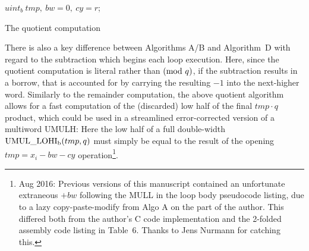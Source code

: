 \documentclass{article}
\begin{document}
\begin{algorithm}[H]
\SetAlgoLined
{}
\vspace{0.1in}
{
	$uint_b\ tmp,\ bw = 0,\ cy = r$;\\
}
\caption{The quotient computation}
\label{algo_d}
\end{algorithm}



There is also a key difference between Algorithms A/B and Algorithm~D with regard to the subtraction which begins each loop execution. Here, since the quotient computation is literal rather than $({\rm mod}\ q)$, if the subtraction results in a borrow, that is accounted for by carrying the resulting $-1$ into the next-higher word. Similarly to the remainder computation, the above quotient algorithm allows for a fast computation of the (discarded) low half of the final $tmp \cdot q$ product, which could be used in a streamlined error-corrected version of a multiword UMULH: Here the low half of a full double-width ${\rm UMUL\_LOHI_b}(tmp, q)$ must simply be equal to the result of the opening $tmp = x_i - bw - cy$ operation\footnote{Aug 2016: Previous versions of this manuscript contained an unfortunate extraneous $+ bw$ following the MULL in the loop body pseudocode listing, due to a lazy copy-paste-modify from Algo A on the part of the author. This differed both from the author's C code implementation and the 2-folded assembly code listing in Table~6. Thanks to Jens Nurmann for catching this.}.
\end{document}
